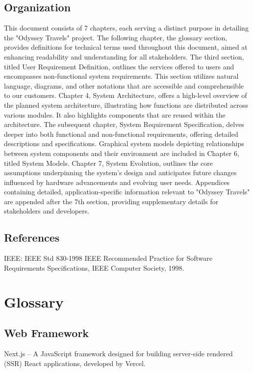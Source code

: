 \documentclass{scrreprt}
\begin{document}
\section{Organization }
This document consists of 7 chapters, each serving a distinct purpose in detailing the "Odyssey Travels" project. The following chapter, the glossary section, provides definitions for technical terms used throughout this document, aimed at enhancing readability and understanding for all stakeholders. The third section, titled User Requirement Definition, outlines the services offered to users and encompasses non-functional system requirements. This section utilizes natural language, diagrams, and other notations that are accessible and comprehensible to our customers.
Chapter 4, System Architecture, offers a high-level overview of the planned system architecture, illustrating how functions are distributed across various modules. It also highlights components that are reused within the architecture. The subsequent chapter, System Requirement Specification, delves deeper into both functional and non-functional requirements, offering detailed descriptions and specifications. Graphical system models depicting relationships between system components and their environment are included in Chapter 6, titled System Models. Chapter 7, System Evolution, outlines the core assumptions underpinning the system's design and anticipates future changes influenced by hardware advancements and evolving user needs.
Appendices containing detailed, application-specific information relevant to "Odyssey Travels" are appended after the 7th section, providing supplementary details for stakeholders and developers.

\section{References}
IEEE: IEEE Std 830-1998 IEEE Recommended Practice for Software Requirements Specifications,
IEEE Computer Society, 1998.

\chapter{Glossary}

\section{Web Framework}
Next.js – A JavaScript framework designed for building server-side rendered (SSR) React applications, developed by Vercel.
\end{document}

